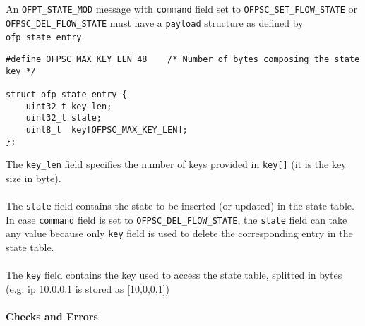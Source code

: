 \noindent
An \texttt{OFPT\_STATE\_MOD} message with \texttt{command} field set to \texttt{OFPSC\_SET\_FLOW\_STATE} or \texttt{OFPSC\_DEL\_FLOW\_STATE} must have a \texttt{payload} structure as defined by \texttt{ofp\_state\_entry}.
\scriptsize
\begin{verbatim}
#define OFPSC_MAX_KEY_LEN 48    /* Number of bytes composing the state key */

struct ofp_state_entry {
    uint32_t key_len;
    uint32_t state;
    uint8_t  key[OFPSC_MAX_KEY_LEN];
};
\end{verbatim}
\normalsize
The \texttt{key\_len} field specifies the number of keys provided in \texttt{key[]} (it is the key size in byte).
\\\\
The \texttt{state} field contains the state to be inserted (or updated) in the state table. In case \texttt{command} field is set to \texttt{OFPSC\_DEL\_FLOW\_STATE}, the \texttt{state} field can take any value because only \texttt{key} field is used to delete the corresponding entry in the state table.
\\\\
The \texttt{key} field contains the key used to access the state table, splitted in bytes (e.g: ip 10.0.0.1 is stored as [10,0,0,1])

\paragraph{Checks and Errors}

